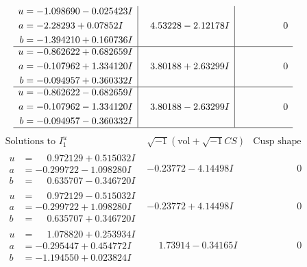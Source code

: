 \documentclass[1p]{elsarticle_modified}
\theoremstyle{definition}
\newcommand{\I}{\sqrt{-1}}
\begin{document}
$$\begin{array}{c|c|c}
\begin{aligned}
u &= -1.098690 - 0.025423 I \\
a &= -2.28293 + 0.07852 I \\
b &= -1.394210 + 0.160736 I\end{aligned}
 & \phantom{-}4.53228 - 2.12178 I & \phantom{-0.000000 } 0 \\ \hline\begin{aligned}
u &= -0.862622 + 0.682659 I \\
a &= -0.107962 + 1.334120 I \\
b &= -0.094957 + 0.360332 I\end{aligned}
 & \phantom{-}3.80188 + 2.63299 I & \phantom{-0.000000 } 0 \\ \hline\begin{aligned}
u &= -0.862622 - 0.682659 I \\
a &= -0.107962 - 1.334120 I \\
b &= -0.094957 - 0.360332 I\end{aligned}
 & \phantom{-}3.80188 - 2.63299 I & \phantom{-0.000000 } 0\\
 \hline 
 \end{array}$$\newpage$$\begin{array}{c|c|c}  
\text{Solutions to }I^u_{1}& \I (\text{vol} + \sqrt{-1}CS) & \text{Cusp shape}\\
 \hline 
\begin{aligned}
u &= \phantom{-}0.972129 + 0.515032 I \\
a &= -0.299722 - 1.098280 I \\
b &= \phantom{-}0.635707 - 0.346720 I\end{aligned}
 & -0.23772 - 4.14498 I & \phantom{-0.000000 } 0 \\ \hline\begin{aligned}
u &= \phantom{-}0.972129 - 0.515032 I \\
a &= -0.299722 + 1.098280 I \\
b &= \phantom{-}0.635707 + 0.346720 I\end{aligned}
 & -0.23772 + 4.14498 I & \phantom{-0.000000 } 0 \\ \hline\begin{aligned}
u &= \phantom{-}1.078820 + 0.253934 I \\
a &= -0.295447 + 0.454772 I \\
b &= -1.194550 + 0.023824 I\end{aligned}
 & \phantom{-}1.73914 - 0.34165 I & \phantom{-0.000000 } 0 \\ \hline\begin{aligned}

\end{aligned}
\end{array}$$
\end{document}
